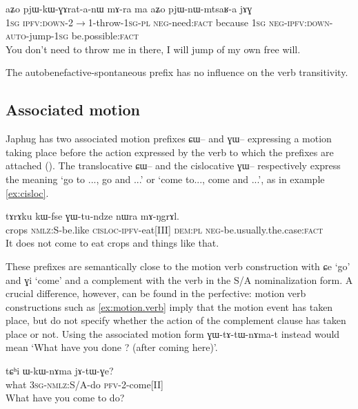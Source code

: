 \documentclass[oldfontcommands,oneside,a4paper,11pt]{article}
\newcommand{\ipa}[1]{{\phon #1}} %
\begin{document}
\begin{exe}
\ex \label{ex:pjWnWmtsaRa}
\gll 
\ipa{aʑo} 	\ipa{pjɯ-kɯ-ɣɤrat-a-nɯ} 	\ipa{mɤ-ra} 	\ipa{ma} 	\ipa{aʑo} 	\ipa{pjɯ-nɯ-mtsaʁ-a} 	\ipa{jɤɣ} \\
\textsc{1sg} \textsc{ipfv:down}-2$\rightarrow$1-throw-\textsc{1sg-pl} \textsc{neg-}need:\textsc{fact} because \textsc{1sg} \textsc{neg-ipfv:down-auto}-jump-\textsc{1sg} be.possible:\textsc{fact} \\
\glt You don't need to throw me in there, I will jump of my own free will.
\end{exe}

The autobenefactive-spontaneous prefix has no influence on the verb transitivity.

\subsection{Associated motion}
Japhug has two associated motion prefixes \ipa{ɕɯ--} and \ipa{ɣɯ--} expressing a motion taking place before the action expressed by the verb to which the prefixes are attached 
(\citealt{jacques13harmonization}). The translocative \ipa{ɕɯ--} and the cislocative \ipa{ɣɯ--} respectively express the meaning `go to ..., go and ...' or `come to..., come and ...', as in example \ref{ex:cisloc}.


\begin{exe}
\ex \label{ex:cisloc}
\gll
\ipa{tɤrɤku} 	\ipa{kɯ-fse} 	\ipa{ɣɯ-tu-ndze} 	\ipa{nɯra} 	\ipa{mɤ-ŋgrɤl.} \\
crops \textsc{nmlz}:S-be.like \textsc{cisloc-ipfv}-eat[III] \textsc{dem:pl} \textsc{neg-}be.usually.the.case:\textsc{fact} \\
\glt It does not come to eat crops and things like that.
\end{exe}

These prefixes are semantically close to the motion verb construction with \ipa{ɕe} `go' and \ipa{ɣi} `come' and a complement with the verb in the S/A nominalization form. A crucial difference, however, can be found in the perfective:  motion verb constructions such as \ref{ex:motion.verb} imply that the motion event has taken place, but do not specify whether the action of the complement clause has taken place or not. Using the associated motion form \ipa{ɣɯ-tɤ-tɯ-nɤma-t} instead would mean `What have you done ? (after coming here)'.

\begin{exe}
\ex \label{ex:motion.verb}
\gll
\ipa{tɕʰi} 	\ipa{ɯ-kɯ-nɤma} 	\ipa{jɤ-tɯ-ɣe?} \\
what \textsc{3sg-nmlz:}S/A-do \textsc{pfv-2}-come[II] \\
\glt What have you come to do?
\end{exe}
\end{document}
